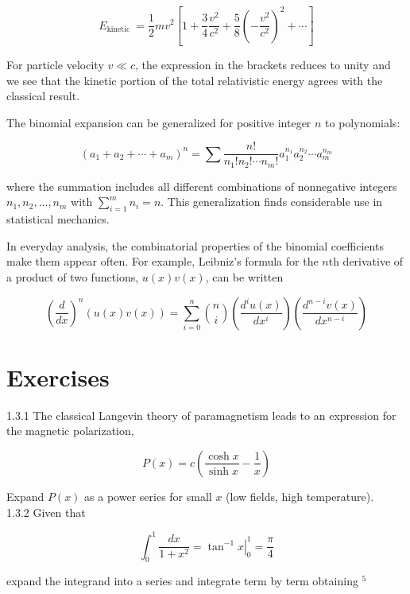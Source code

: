\documentclass[10pt]{article}
\begin{document}
\begin{equation*}
E_{\text {kinetic }}=\frac{1}{2} m v^{2}\left[1+\frac{3}{4} \frac{v^{2}}{c^{2}}+\frac{5}{8}\left(-\frac{v^{2}}{c^{2}}\right)^{2}+\cdots\right] \tag{1.79}
\end{equation*}


For particle velocity $v \ll c$, the expression in the brackets reduces to unity and we see that the kinetic portion of the total relativistic energy agrees with the classical result.

The binomial expansion can be generalized for positive integer $n$ to polynomials:


\begin{equation*}
\left(a_{1}+a_{2}+\cdots+a_{m}\right)^{n}=\sum \frac{n!}{n_{1}!n_{2}!\cdots n_{m}!} a_{1}^{n_{1}} a_{2}^{n_{2}} \cdots a_{m}^{n_{m}} \tag{1.80}
\end{equation*}


where the summation includes all different combinations of nonnegative integers $n_{1}, n_{2}, \ldots, n_{m}$ with $\sum_{i=1}^{m} n_{i}=n$. This generalization finds considerable use in statistical mechanics.

In everyday analysis, the combinatorial properties of the binomial coefficients make them appear often. For example, Leibniz's formula for the $n$th derivative of a product of two functions, $u(x) v(x)$, can be written


\begin{equation*}
\left(\frac{d}{d x}\right)^{n}(u(x) v(x))=\sum_{i=0}^{n}\binom{n}{i}\left(\frac{d^{i} u(x)}{d x^{i}}\right)\left(\frac{d^{n-i} v(x)}{d x^{n-i}}\right) \tag{1.81}
\end{equation*}


\section*{Exercises}
1.3.1 The classical Langevin theory of paramagnetism leads to an expression for the magnetic polarization,

$$
P(x)=c\left(\frac{\cosh x}{\sinh x}-\frac{1}{x}\right)
$$

Expand $P(x)$ as a power series for small $x$ (low fields, high temperature).\\
1.3.2 Given that

$$
\int_{0}^{1} \frac{d x}{1+x^{2}}=\left.\tan ^{-1} x\right|_{0} ^{1}=\frac{\pi}{4}
$$

expand the integrand into a series and integrate term by term obtaining ${ }^{5}$
\end{document}
